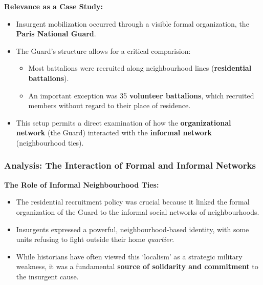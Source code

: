 \documentclass{article}
\begin{document}
    \noindent \textbf{Relevance as a Case Study:}
    \begin{itemize}
        \item Insurgent mobilization occurred through a visible formal
        organization, the \textbf{Paris National Guard}.
        \item The Guard's structure allows for a critical comparision:
        \begin{itemize}
            \item Most battalions were recruited along neighbourhood lines (\textbf{residential battalions}).
            \item An important exception was 35 \textbf{volunteer battalions}, which recruited members without regard to their place of residence.
        \end{itemize}
        \item This setup permits a direct examination of how the
        \textbf{organizational network} (the Guard) interacted with the \textbf{informal network} (neighbourhood ties).
    \end{itemize}

    \subsubsection{Analysis: The Interaction of Formal and Informal Networks}

    \noindent \textbf{The Role of Informal Neighbourhood Ties:}
    \begin{itemize}
        \item The residential recruitment policy was crucial because it
        linked the formal organization of the Guard to the informal social
        networks of neighbourhoods.
        \item Insurgents expressed a powerful, neighbourhood-based identity,
        with some units refusing to fight outside their home \textit{quartier}.
        \item While historians have often viewed this `localism' as a
        strategic military weakness, it was a fundamental
        \textbf{source of solidarity and commitment} to the insurgent cause.
    \end{itemize}
\end{document}
